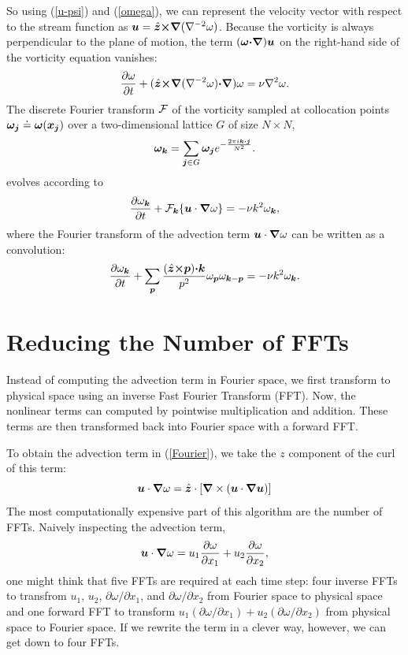 \documentclass[12pt]{article}
\def\v{\bm}
\def\lap{{\nabla}^2}
\def\lapinv{{\nabla}^{-2}}
\def\vw{{\v\w}}
\def\Eq#1{(\ref{#1})}
\begin{document}
So using \Eq{u-psi} and \Eq{omega}, we can represent the velocity
vector with respect to the stream function as
$\vu=\hat{\vz}\cross\grad(\lapinv\omega)$.
Because the vorticity is always perpendicular to the plane of motion,
the term $(\vw\dot\grad)\vu$ on the right-hand side of the vorticity equation vanishes:
$$\frac{\partial \omega}{\partial t} + (\hat{\vz}\cross\grad(\lapinv\omega)\dot\grad)\omega= \nu\lap\omega .$$
The discrete Fourier transform ${\cal F}$ of the vorticity sampled at collocation
points $\vw_\vj\doteq\vw(\vx_\vj)$ over a two-dimensional lattice
$G$ of size $N\times N$,
$$
\vw_{\vk}=\sum_{\vj\in G} \vw_\vj e^{-\fr{2\pi i\vk\dot\vj}{N^2}}.
$$
evolves according to
\begin{equation}\label{Fourier}
\frac{\partial\omega_{\vk}}{\partial t} + {\cal F}_\vk\{\vu\cdot\grad\omega\}= -\nu k^2\omega_{\vk},
\end{equation}
where the Fourier transform of the advection term
$\vu\cdot\grad\omega$ can be written as a convolution:
\begin{equation}\label{Fourier-expand}
\frac{\partial\omega_{\vk}}{\partial t} + \sum_{\vp}{\frac{(\hat{\vz}\cross\vp)\dot\vk}{p^2}\omega_{\vp}\omega_{\vk-\vp}}= -\nu k^2\omega_{\vk}.
\end{equation}
\section{Reducing the Number of FFTs}
Instead of computing the advection term in Fourier space, we first transform to physical space using an inverse Fast Fourier Transform (FFT). Now, the nonlinear terms can computed by pointwise multiplication and addition. These terms are then transformed back into Fourier space with a forward FFT.

To obtain the advection term in \Eq{Fourier}, we take the $z$ component of the curl of this term:
\begin{equation}\label{zAdvection}
\vu\cdot\grad\omega =\hat{\vz}\cdot \left[\grad \times \left(\vu\cdot\grad\vu \right)\right]
\end{equation}
The most computationally expensive part of this algorithm are the number of FFTs. Naively inspecting the advection term,
\begin{equation}
\vu\cdot\grad\omega = u_1\frac{\partial \omega}{\partial x_1}+u_2\frac{\partial \omega}{\partial x_2},
\end{equation}
one might think that five FFTs are required at each time step: four
inverse FFTs to transfrom $u_1$, $ u_2$, $\partial \omega/\partial x_1$, and $\partial \omega/\partial x_2$ from Fourier space to physical space and one forward FFT to transform $u_1\left(\partial \omega/\partial x_1\right)+u_2\left(\partial \omega/\partial x_2\right)$ from physical space to Fourier space. If we rewrite the term in a clever way, however, we can get down to four FFTs.
\end{document}
